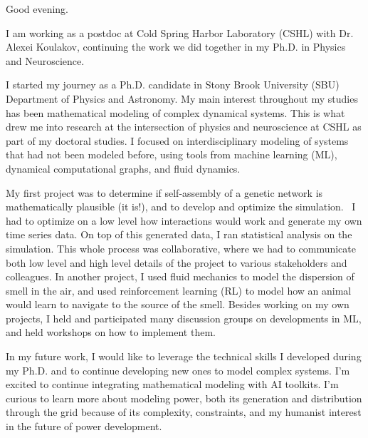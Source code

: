 Good evening.

I am working as a postdoc at Cold Spring Harbor Laboratory (CSHL) with Dr. Alexei Koulakov,
continuing the work we did together in my Ph.D. in Physics and Neuroscience.

I started my journey as a Ph.D. candidate in Stony Brook University (SBU) Department of Physics and Astronomy.
My main interest throughout my studies has been mathematical modeling of complex dynamical systems.
This is what drew me into research at the intersection of physics and neuroscience at CSHL as part of my doctoral studies.
I focused on interdisciplinary modeling of systems that had not been modeled before,
using tools from machine learning (ML), dynamical computational graphs, and fluid dynamics.

My first project was to determine if self-assembly of a genetic network is mathematically plausible (it is!),
and to develop and optimize the simulation.~\cite{connclone}
I had to optimize on a low level how interactions would work and generate my own time series data.
On top of this generated data, I ran statistical analysis on the simulation.
This whole process was collaborative, where we had to communicate both low level
and high level details of the project to various stakeholders and colleagues.
In another project, I used fluid mechanics to model the dispersion of smell in the air,
and used reinforcement learning (RL) to model how an animal would learn to navigate to the source of the smell.
Besides working on my own projects, I held and participated many discussion groups
on developments in ML, and held workshops on how to implement them.

In my future work, I would like to leverage the technical skills I developed during my Ph.D.
and to continue developing new ones to model complex systems.
I’m excited to continue integrating mathematical modeling with AI toolkits.
I’m curious to learn more about modeling power,
both its generation and distribution through the grid because of its complexity,
constraints, and my humanist interest in the future of power development.


